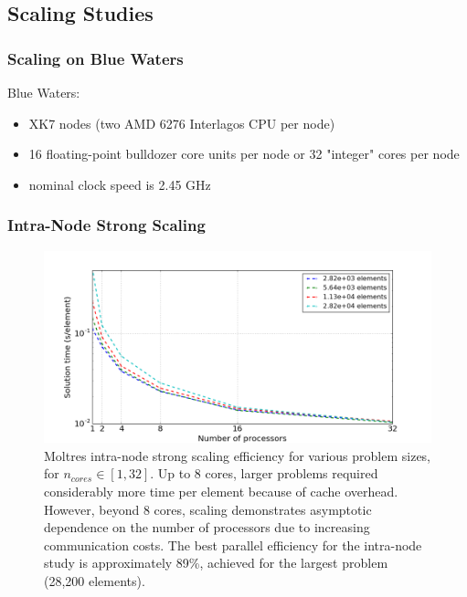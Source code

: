 \subsection{Scaling Studies}
\begin{frame}
        \frametitle{Scaling on Blue Waters}
Blue Waters:
         \begin{itemize}
                 \item XK7 nodes (two AMD 6276 Interlagos CPU per node)
                 \item 16 floating-point bulldozer core units per node or 32 "integer" cores per node 
                 \item nominal clock speed is 2.45 GHz
         \end{itemize}
\end{frame}

\begin{frame}
        \frametitle{Intra-Node Strong Scaling}
        \vspace*{-0.2in}
\begin{figure}[htpb]
  \centering
  \includegraphics[width=\textwidth]{./images/intra-node_strong.png}
  \caption{Moltres intra-node strong scaling efficiency for various problem
        sizes, for $n_{cores} \in [1,32]$.  Up to 8 cores, larger problems required considerably more time per element because of cache overhead. However, beyond 8 cores, scaling demonstrates asymptotic dependence on the number of processors due to increasing communication costs. The best parallel efficiency for the intra-node study is approximately 89\%, achieved for the largest problem (28,200 elements).}
  \label{fig:intra_strong_scaling}
\end{figure}

\end{frame}

